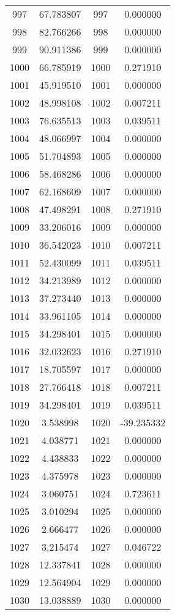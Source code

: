 \documentclass[12pt]{article}
\begin{document}
\begin{longtable}{@{}cccc@{}}
997 & 67.783807 & 997 & 0.000000 \\
998 & 82.766266 & 998 & 0.000000 \\
999 & 90.911386 & 999 & 0.000000 \\
1000 & 66.785919 & 1000 & 0.271910 \\
1001 & 45.919510 & 1001 & 0.000000 \\
1002 & 48.998108 & 1002 & 0.007211 \\
1003 & 76.635513 & 1003 & 0.039511 \\
1004 & 48.066997 & 1004 & 0.000000 \\
1005 & 51.704893 & 1005 & 0.000000 \\
1006 & 58.468286 & 1006 & 0.000000 \\
1007 & 62.168609 & 1007 & 0.000000 \\
1008 & 47.498291 & 1008 & 0.271910 \\
1009 & 33.206016 & 1009 & 0.000000 \\
1010 & 36.542023 & 1010 & 0.007211 \\
1011 & 52.430099 & 1011 & 0.039511 \\
1012 & 34.213989 & 1012 & 0.000000 \\
1013 & 37.273440 & 1013 & 0.000000 \\
1014 & 33.961105 & 1014 & 0.000000 \\
1015 & 34.298401 & 1015 & 0.000000 \\
1016 & 32.032623 & 1016 & 0.271910 \\
1017 & 18.705597 & 1017 & 0.000000 \\
1018 & 27.766418 & 1018 & 0.007211 \\
1019 & 34.298401 & 1019 & 0.039511 \\
1020 & 3.538998 & 1020 & -39.235332 \\
1021 & 4.038771 & 1021 & 0.000000 \\
1022 & 4.438833 & 1022 & 0.000000 \\
1023 & 4.375978 & 1023 & 0.000000 \\
1024 & 3.060751 & 1024 & 0.723611 \\
1025 & 3.010294 & 1025 & 0.000000 \\
1026 & 2.666477 & 1026 & 0.000000 \\
1027 & 3.215474 & 1027 & 0.046722 \\
1028 & 12.337841 & 1028 & 0.000000 \\
1029 & 12.564904 & 1029 & 0.000000 \\
1030 & 13.038889 & 1030 & 0.000000 \\

\end{longtable}
\end{document}
